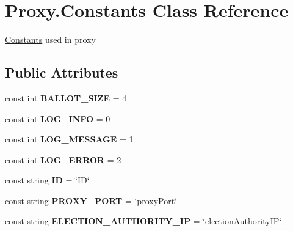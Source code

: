 \hypertarget{class_proxy_1_1_constants}{}\section{Proxy.\+Constants Class Reference}
\label{class_proxy_1_1_constants}


\hyperlink{class_proxy_1_1_constants}{Constants} used in proxy  


\subsection*{Public Attributes}
\begin{DoxyCompactItemize}
\item 
\hypertarget{class_proxy_1_1_constants_ada4ea33d4ef740841c0afabbe2848e9e}{}const int {\bfseries B\+A\+L\+L\+O\+T\+\_\+\+S\+I\+Z\+E} = 4\label{class_proxy_1_1_constants_ada4ea33d4ef740841c0afabbe2848e9e}

\item 
\hypertarget{class_proxy_1_1_constants_ac5af87b42d58fc19097374a8b9dcce51}{}const int {\bfseries L\+O\+G\+\_\+\+I\+N\+F\+O} = 0\label{class_proxy_1_1_constants_ac5af87b42d58fc19097374a8b9dcce51}

\item 
\hypertarget{class_proxy_1_1_constants_a9d8016deecf8e19fc09c5dde9c712e76}{}const int {\bfseries L\+O\+G\+\_\+\+M\+E\+S\+S\+A\+G\+E} = 1\label{class_proxy_1_1_constants_a9d8016deecf8e19fc09c5dde9c712e76}

\item 
\hypertarget{class_proxy_1_1_constants_a69b86ab5abe6eb48b0d363cd51dd92b7}{}const int {\bfseries L\+O\+G\+\_\+\+E\+R\+R\+O\+R} = 2\label{class_proxy_1_1_constants_a69b86ab5abe6eb48b0d363cd51dd92b7}

\item 
\hypertarget{class_proxy_1_1_constants_acf5d5e7b50cc684988ca26b052603f01}{}const string {\bfseries I\+D} = \char`\"{}I\+D\char`\"{}\label{class_proxy_1_1_constants_acf5d5e7b50cc684988ca26b052603f01}

\item 
\hypertarget{class_proxy_1_1_constants_ae50fa3b56cea0bf5a0d36b5e76c84761}{}const string {\bfseries P\+R\+O\+X\+Y\+\_\+\+P\+O\+R\+T} = \char`\"{}proxy\+Port\char`\"{}\label{class_proxy_1_1_constants_ae50fa3b56cea0bf5a0d36b5e76c84761}

\item 
\hypertarget{class_proxy_1_1_constants_a096cdc1e6ca88ec76d51d1522120e400}{}const string {\bfseries E\+L\+E\+C\+T\+I\+O\+N\+\_\+\+A\+U\+T\+H\+O\+R\+I\+T\+Y\+\_\+\+I\+P} = \char`\"{}election\+Authority\+I\+P\char`\"{}\label{class_proxy_1_1_constants_a096cdc1e6ca88ec76d51d1522120e400}


\end{DoxyCompactItemize}
